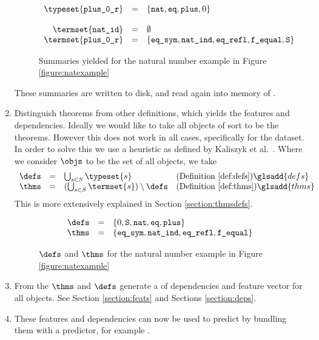 \begin{enumerate}
\begin{figure}[H]
\[\begin{array}{rcl}
					\typeset{\texttt{plus\_0\_r}} & = & \{ \texttt{nat}, \texttt{eq}, \texttt{plus}, 0 \} \\
					& & \\
					\termset{\texttt{nat\_id}} & = & \emptyset \\
					\termset{\texttt{plus\_0\_r}} & = & \{ \texttt{eq\_sym}, \texttt{nat\_ind}, \texttt{eq\_refl}, \texttt{f\_equal}, \texttt{S} \}
				\end{array}
			\]
			\caption{Summaries yielded for the natural number example in Figure \ref{figure:natexample}}
		\end{figure}
		These summaries are written to disk, and read again into memory of \roerei.
	\item Distinguish theorems from other definitions, which yields the features and dependencies.
		Ideally we would like to take all objects of sort \sortprop to be the theorems.
		However this does not work in all cases, specifically for the \corn dataset.
		In order to solve this we use a heuristic as defined by Kaliszyk et al.\ \cite{kaliszyk2014machine}.
		Where we consider $\objs$ to be the set of all \coq objects, we take
    \[
      \begin{array}{rcll}
        \defs & = & \bigcup_{s \in S} \typeset{s} & \text{(Definition \ref{def:defs})}\glsadd{defs} \\
        \thms & = & (\bigcup_{s \in S} \termset{s}) \setminus \defs & \text{(Definition \ref{def:thms})}\glsadd{thms}
      \end{array}
    \]
		This is more extensively explained in Section \ref{section:thmsdefs}.
		\begin{figure}[H]
			\[
				\begin{array}{rcl}
					\defs & = & \{ 0, \texttt{S}, \texttt{nat}, \texttt{eq}, \texttt{plus} \} \\
					\thms & = & \{ \texttt{eq\_sym}, \texttt{nat\_ind}, \texttt{eq\_refl}, \texttt{f\_equal} \}
				\end{array}
			\]
			\caption{$\defs$ and $\thms$ for the natural number example in Figure \ref{figure:natexample}}
		\end{figure}
    \item From the $\thms$ and $\defs$ generate a \dagraph of dependencies and feature vector for all \coq objects.
      See Section \ref{section:feats} and Sections \ref{section:deps}.
		 
	\item These features and dependencies can now be used to predict by bundling them with a predictor, for example \knn.
\end{enumerate}

